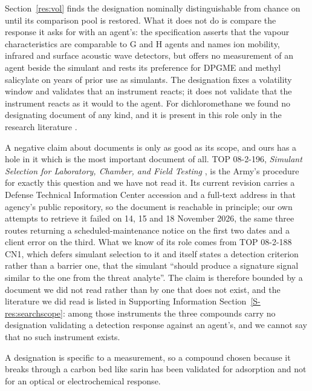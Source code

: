 \documentclass[journal=ancham,manuscript=article,margin=1in]{achemso}
\begin{document}
Section~\ref{res:vol} finds the designation nominally distinguishable from
chance on until its comparison pool is restored. What it does not do is compare the response it asks for with an
agent's: the specification asserts that the vapour characteristics are
comparable to G and H agents and names ion mobility, infrared and surface
acoustic wave detectors, but offers no measurement of an agent beside the
simulant and rests its preference for DPGME and methyl salicylate on years of
prior use as simulants. The designation fixes a volatility window and validates
that an instrument reacts; it does not validate that the instrument reacts as it
would to the agent. For dichloromethane we
found no designating document of any kind, and it is present in this role only
in the research literature \cite{lee2011sno2}.

A negative claim about documents is only as good as its scope, and ours has a
hole in it which is the most important document of all. TOP 08-2-196,
\emph{Simulant Selection for Laboratory, Chamber, and Field Testing}
\cite{top082196}, is the Army's procedure for exactly this question and we have
not read it. Its current revision carries a Defense Technical Information Center
accession and a full-text address in that agency's public repository, so the
document is reachable in principle; our own attempts to retrieve it
failed on 14, 15 and 18 November 2026, the same three routes returning a
scheduled-maintenance notice on the first two dates and a client error on the
third. What we know of its
role comes from TOP 08-2-188 CN1, which defers simulant selection to it
\cite{top082188} and itself states a detection criterion rather than a barrier
one, that the simulant ``should produce a signature signal similar to the one
from the threat analyte''. The claim is therefore bounded by a document we did
not read rather than by one that does not exist, and the literature we did read
is listed in Supporting Information Section~\ref{S-res:searchscope}: among those
instruments the three compounds carry no designation validating a detection
response against an agent's, and we cannot say that no such instrument exists.

A designation is specific to a measurement,
so a compound chosen because it breaks through a carbon bed like sarin has been
validated for adsorption and not for an optical or electrochemical response.
\end{document}
